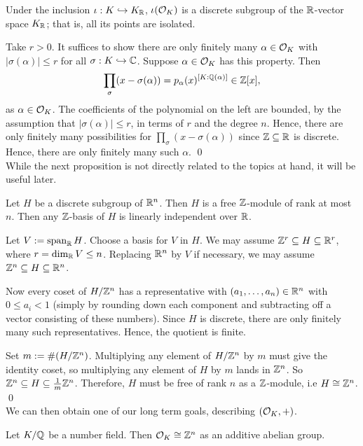 \begin{prop}
Under the inclusion $\iota: K \hookrightarrow K_{\mathbb{R}}$, $\iota(\mathcal{O}_K)$ is a discrete subgroup of the $\mathbb{R}$-vector space $K_{\mathbb{R}}$; that is, all its points are isolated. 
\end{prop}

\pf Take $r>0$. It suffices to show there are only finitely many $\alpha \in \mathcal{O}_K$ with $|\sigma(\alpha)| \leq r$ for all $\sigma: K \hookrightarrow \mathbb{C}$. Suppose $\alpha \in \mathcal{O}_K$ has this property. Then
	\[
	\prod_\sigma (x - \sigma(\alpha))= p_\alpha(x)^{[K:\mathbb{Q}(\alpha)]} \in \mathbb{Z}[x],
	\]
as $\alpha \in \mathcal{O}_K$. The coefficients of the polynomial on the left are bounded, by the assumption that $|\sigma(\alpha)| \leq r$, in terms of $r$ and the degree $n$. Hence, there are only finitely many possibilities for $\prod_\sigma (x - \sigma(\alpha))$ since $\mathbb{Z} \subseteq \mathbb{R}$ is discrete. Hence, there are only finitely many such $\alpha$. \qed \\


While the next proposition is not directly related to the topics at hand, it will be useful later.

\begin{prop}\label{prop:zbasis}
Let $H$ be a discrete subgroup of $\mathbb{R}^n$. Then $H$ is a free $\mathbb{Z}$-module of rank at most $n$. Then any $\mathbb{Z}$-basis of $H$ is linearly independent over $\mathbb{R}$. 
\end{prop}

\pf Let $V:= \operatorname{span}_{\mathbb{R}} H$. Choose a basis for $V$ in $H$. We may assume $\mathbb{Z}^r \subseteq H \subseteq \mathbb{R}^r$, where $r=\dim_{\mathbb{R}} V \leq n$. Replacing $\mathbb{R}^n$ by $V$ if necessary, we may assume $\mathbb{Z}^n \subseteq H \subseteq \mathbb{R}^n$. 

Now every coset of $H/\mathbb{Z}^n$ has a representative with $(a_1,\ldots,a_n) \in \mathbb{R}^n$ with $0 \leq a_i<1$ (simply by rounding down each component and subtracting off a vector consisting of these numbers). Since $H$ is discrete, there are only finitely many such representatives. Hence, the quotient is finite.

Set $m:= \#(H/\mathbb{Z}^n)$. Multiplying any element of $H/\mathbb{Z}^n$ by $m$ must give the identity coset, so multiplying any element of $H$ by $m$ lands in $\mathbb{Z}^n$. So $\mathbb{Z}^n \subseteq H \subseteq \frac{1}{m} \mathbb{Z}^n$. Therefore, $H$ must be free of rank $n$ as a $\mathbb{Z}$-module, i.e $H \cong \mathbb{Z}^n$. \qed \\

We can then obtain one of our long term goals, describing $(\mathcal{O}_K,+)$.

\begin{prop}\label{prop:ringintabelian}
Let $K/\mathbb{Q}$ be a number field. Then $\mathcal{O}_K \cong \mathbb{Z}^n$ as an additive abelian group.
\end{prop}

